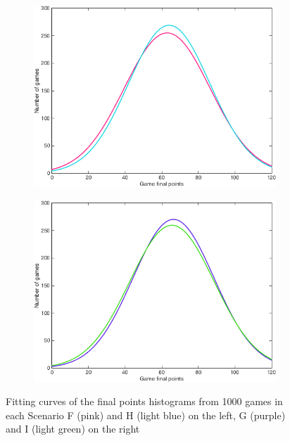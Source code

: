 \begin{figure}[h]
        \centering
        \begin{subfigure}[h]{0.4\textwidth}
                \includegraphics[width=\textwidth]{./img/4/FH}
                \label{fig:FH}
        \end{subfigure}
        \begin{subfigure}[h]{0.4\textwidth}
                \includegraphics[width=\textwidth]{./img/4/GI}
                \label{fig:GI}
        \end{subfigure}
        \caption{Fitting curves of the final points histograms from 1000 games in each Scenario F (pink) and H (light blue) on the left, G (purple) and I (light green) on the right}
        \label{fig:FGHI}
\end{figure}

